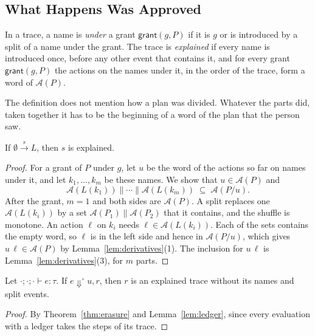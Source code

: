 \documentclass[acmsmall,nonacm,screen]{acmart}
\newcommand{\kw}[1]{\mathsf{#1}}
\newcommand{\auth}[1]{\mathcal{A}(#1)}
\newcommand{\sh}{\mathbin{\parallel}}
\newcommand{\evto}{\Downarrow}
\newcommand{\lstep}[1]{\xrightarrow{\,#1\,}}
\begin{document}
\subsection{What Happens Was Approved}

\begin{definition}
\label{def:explained}
In a trace, a name is \emph{under} a grant $\kw{grant}(g, P)$ if it is $g$ or is introduced
by a split of a name under the grant. The trace is \emph{explained} if every name is
introduced once, before any other event that contains it, and for every grant
$\kw{grant}(g, P)$ the actions on the names under it, in the order of the trace, form a word
of $\auth{P}$.
\end{definition}

The definition does not mention how a plan was divided. Whatever the parts did, taken
together it has to be the beginning of a word of the plan that the person saw.

\begin{lemma}
\label{lem:ledger}
If $\emptyset \lstep{s} L$, then $s$ is explained.
\end{lemma}

\begin{proof}
For a grant of $P$ under $g$, let $u$ be the word of the actions so far on names under it,
and let $k_1, \ldots, k_m$ be these names. We show that $u \in \auth{P}$ and
\[
\auth{L(k_1)} \sh \cdots \sh \auth{L(k_m)} \;\subseteq\; \auth{P / u}.
\]
After the grant, $m = 1$ and both sides are $\auth{P}$. A split replaces one $\auth{L(k_i)}$
by a set $\auth{P_1} \sh \auth{P_2}$ that it contains, and the shuffle is monotone. An
action $\ell$ on $k_i$ needs $\ell \in \auth{L(k_i)}$. Each of the sets contains the empty
word, so $\ell$ is in the left side and hence in $\auth{P / u}$, which gives
$u\,\ell \in \auth{P}$ by Lemma~\ref{lem:derivatives}(1). The inclusion for $u\,\ell$ is
Lemma~\ref{lem:derivatives}(3), for $m$ parts.
\end{proof}

\begin{theorem}[Consent]
\label{thm:consent}
Let $\cdot; \cdot; \cdot \vdash e : \tau$. If $e \evto^{\circ} u, r$, then $r$ is an
explained trace without its names and split events.
\end{theorem}

\begin{proof}
By Theorem~\ref{thm:erasure} and Lemma~\ref{lem:ledger}, since every evaluation with a ledger
takes the steps of its trace.
\end{proof}
\end{document}
